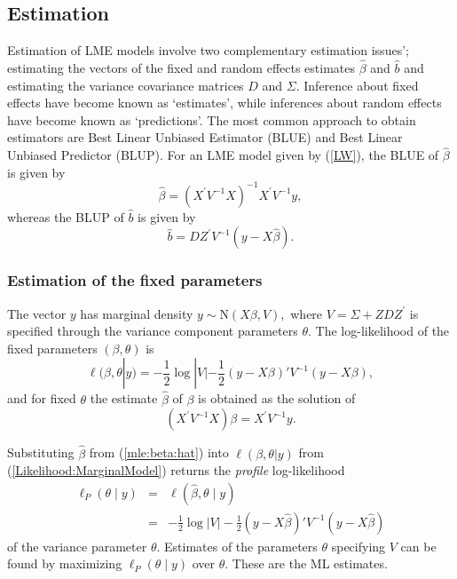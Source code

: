 \documentclass[12pt, a4paper]{report}
\theoremstyle{plain}
\theoremstyle{definition}
\theoremstyle{remark}
\begin{document}
	
	\subsection{Estimation}
	Estimation of LME models involve two complementary estimation issues'; estimating the vectors of the fixed and random effects estimates $\hat{\beta}$ and $\hat{b}$ and estimating the variance covariance matrices $D$ and $\Sigma$.
	Inference about fixed effects have become known as `estimates', while inferences about random effects have become known as `predictions'. The most common approach to obtain estimators are Best Linear Unbiased Estimator (BLUE) and Best Linear Unbiased Predictor (BLUP). For an LME model given by (\ref{LW}), the BLUE of $\hat{\beta}$ is given by
	\[\hat{\beta} = (X^\prime V^{-1}X)^{-1}X^\prime V^{-1}y,\]whereas the BLUP of $\hat{b}$ is given by
	\[\hat{b} = DZ^{\prime} V^{-1} (y-X\hat{\beta}).\]
	
	
	
	\subsubsection{Estimation of the fixed parameters}
	
	The vector $y$ has marginal density $y \sim \mathrm{N}(X \beta,V),$ where $V = \Sigma + ZDZ^\prime$ is specified through the variance component parameters $\theta.$ The log-likelihood of the fixed parameters $(\beta, \theta)$ is
	\begin{equation}
	\ell (\beta, \theta|y) =
	-\frac{1}{2} \log |V| -\frac{1}{2}(y -
	X \beta)'V^{-1}(y -
	X \beta), \label{Likelihood:MarginalModel}
	\end{equation}
	and for fixed $\theta$ the estimate $\hat{\beta}$ of $\beta$ is obtained as the solution of
	\begin{equation}
	(X^\prime V^{-1}X) {\beta} = X^\prime V^{-1}y.
	\label{mle:beta:hat}
	\end{equation}
	
	Substituting $\hat{\beta}$ from (\ref{mle:beta:hat}) into $\ell(\beta, \theta|y)$ from (\ref{Likelihood:MarginalModel}) returns the \emph{profile} log-likelihood
	\begin{eqnarray*}
		\ell_P(\theta \mid y) &=& \ell(\hat{\beta}, \theta \mid y) \\
		&=& -\frac{1}{2} \log |V| -\frac{1}{2}(y - X \hat{\beta})'V^{-1}(y - X \hat{\beta})
	\end{eqnarray*}
	of the variance parameter $\theta.$ Estimates of the parameters $\theta$ specifying $V$ can be found by maximizing $\ell_P(\theta \mid y)$ over $\theta.$ These are the ML estimates.
	
\end{document}
